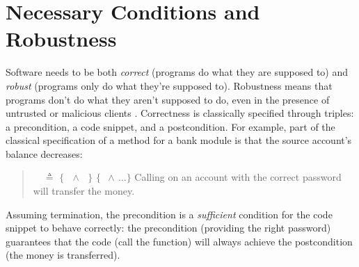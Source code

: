 \section{Necessary Conditions and Robustness}
\label{s:intro}




{Software needs} to be both {\emph{correct}} ({programs do what they
  are supposed to}) and {\emph{robust}} ({programs only do what
  they're supposed to}). Robustness means that
programs don't do what they aren't supposed to do, even in the
presence of untrusted or malicious {clients} \cite{ieeeStandard}.
{Correctness is} classically specified
through  triples: a  precondition, a code snippet, and a
 postcondition. 
 For example,  {part of the classical specification
   of a  method for a bank module is that the source account's balance decreases:}
 \begin{quote}
   \Scorrect\ \ $\triangleq$  
 {\footnotesize{ $\{\,$ $\,\wedge\,$ $\,\}$  $\{$ $\,\wedge\,\dots \}$ }} Calling  on  {an account with the correct password} will transfer the money.
\end{quote}
Assuming termination, the precondition is a \emph{sufficient} condition for the {code snippet to behave correctly}: 
the precondition (\eg providing the right 
password) guarantees that
the code (\eg call the  function)
will always achieve the postcondition (the money is transferred).
 
